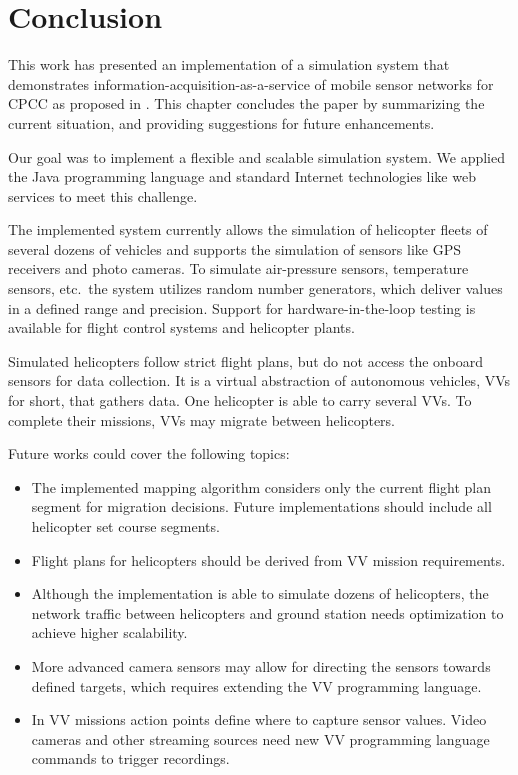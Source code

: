 
\chapter{Conclusion}

This work has presented an implementation of a simulation system that demonstrates information-acquisition-as-a-service
of mobile sensor networks for \ac{CPCC} as proposed in \cite{HotCloud10}.
%
This chapter concludes the paper by summarizing the current situation, and providing suggestions for future
enhancements.

Our goal was to implement a flexible and scalable simulation system. We applied 
the Java programming language and standard Internet technologies like web services to meet this challenge.  

The implemented system currently allows the simulation of helicopter fleets of several dozens of vehicles
and supports the simulation of sensors like GPS receivers and photo cameras.
To simulate air-pressure sensors, temperature sensors, etc.~the system utilizes random number generators, which
deliver values in a defined range and precision.
%
Support for hardware-in-the-loop testing is available for flight control systems and helicopter plants.
%

Simulated helicopters follow strict flight plans, but do not access the onboard sensors for data collection.
It is a virtual abstraction of autonomous vehicles, \acfp{VV} for short, that gathers data.
One helicopter is able to carry several \acp{VV}. To complete their missions, \acp{VV} may migrate between helicopters.


Future works could cover the following topics:
\begin{itemize}
  \item The implemented mapping algorithm considers only the current flight plan segment for migration decisions.
  	Future implementations should include all helicopter set course segments.
   
   \item Flight plans for helicopters should be derived from \ac{VV} mission requirements. 
   
   \item Although the implementation is able to simulate dozens of helicopters, the network traffic between
   	helicopters and ground station needs optimization to achieve higher scalability.
   
   \item More advanced camera sensors may allow for directing the sensors towards defined targets, which requires
   	extending the \ac{VV} programming language.
   
   \item In \ac{VV} missions action points define where to capture sensor values. Video cameras  
   	and other streaming sources need new \ac{VV} programming language commands to trigger recordings.

\end{itemize}

